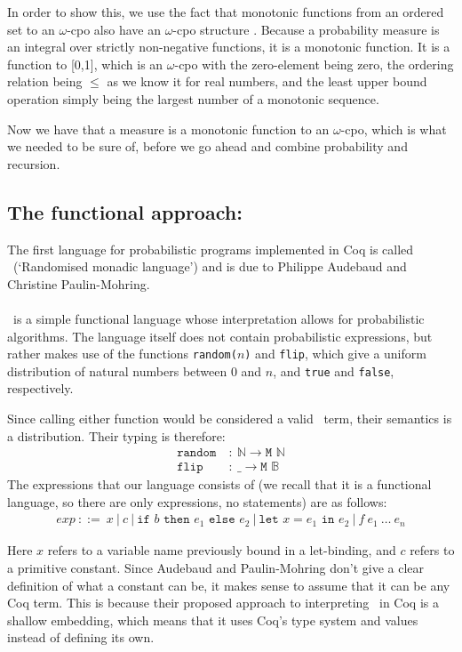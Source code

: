 \documentclass[11pt, leqno, titlepage]{article}
\theoremstyle{definition}
\begin{document}
In order to show this, we use the fact that monotonic functions from an ordered set
to an $\omega$-cpo also have an $\omega$-cpo structure \cite[p.~584]{rml-paper}.
Because a probability measure is an integral over strictly non-negative functions, it
is a monotonic function. It is a function to [0,1], which is an $\omega$-cpo with
the zero-element being zero, the ordering relation being $\le$ as we know it for real
numbers, and the least upper bound operation simply being the largest number of a
monotonic sequence.

Now we have that a measure is a monotonic function to an $\omega$-cpo, which is
what we needed to be sure of, before we go ahead and combine probability and
recursion. 


\subsection{The functional approach: \rml}\label{sec:rml}
The first language for probabilistic programs implemented in Coq is called \rml\
(`Randomised monadic language') and is due to Philippe Audebaud and Christine
Paulin-Mohring\cite{rml-paper}.
\\ \\
\rml\ is a simple functional language whose interpretation allows for probabilistic
algorithms. The language itself does not contain probabilistic expressions, but
rather makes use of the functions \texttt{random($n$)} and \texttt{flip}, which give
a uniform distribution of natural numbers between 0 and $n$, and \texttt{true} and
\texttt{false}, respectively.

Since calling either function would be considered a valid \rml\ term, their semantics
is a distribution. Their typing is therefore:
\begin{align*}
  \texttt{random} &~:~\mathbb{N} \to \texttt{M }\mathbb{N}\\
  \texttt{flip}   &~:~ \_ \to \texttt{M }\mathbb{B}
\end{align*}
\noindent The expressions that our language consists of (we recall that it is a functional
language, so there are only expressions, no statements) are as follows:
\begin{align*}
  exp~::= ~ x~\vert ~ c~\vert ~ \texttt{if }b\texttt{ then }e_1\texttt{ else } e_2~
  \vert ~ \texttt{let }x = e_1 \texttt{ in }e_2~\vert ~ f~e_1~\dots~e_n
\end{align*}

Here $x$ refers to a variable name previously bound in a let-binding, and $c$ refers
to a primitive constant. Since Audebaud and Paulin-Mohring don't give a clear
definition of what a constant can be, it makes sense to assume that it can be any
Coq term. This is because their proposed approach to interpreting \rml\ in Coq is a
shallow embedding, which means that it uses Coq's type system and values instead of
defining its own. 
\end{document}
